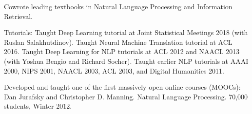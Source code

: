 \documentclass[11pt,letterpaper]{article}
\def\url#1{{\small\sf #1}}
\begin{document}
\begin{vita}
\begin{Products (other significant)}




\end{Products (other significant)}

\begin{Synergistic Activities}

\item Cowrote leading textbooks in Natural
  Language Processing and Information Retrieval.

\item Tutorials: Taught Deep Learning tutorial at Joint Statistical Meetings 2018 (with Ruslan Salakhutdinov).
Taught Neural Machine Translation tutorial at ACL 2016.
Taught Deep Learning for NLP tutorials at ACL 2012 and NAACL 2013 (with Yoshua Bengio and Richard Socher).
Taught earlier NLP tutorials at AAAI 2000, NIPS 2001, NAACL 2003, ACL 2003, and Digital Humanities 2011.

\item Developed and taught one of the first massively open online
  courses (MOOCs): Dan Jurafsky and Christopher D. Manning. Natural Language Processing. 70,000 students, Winter 2012.


\end{Synergistic Activities}
\end{vita}
\end{document}
